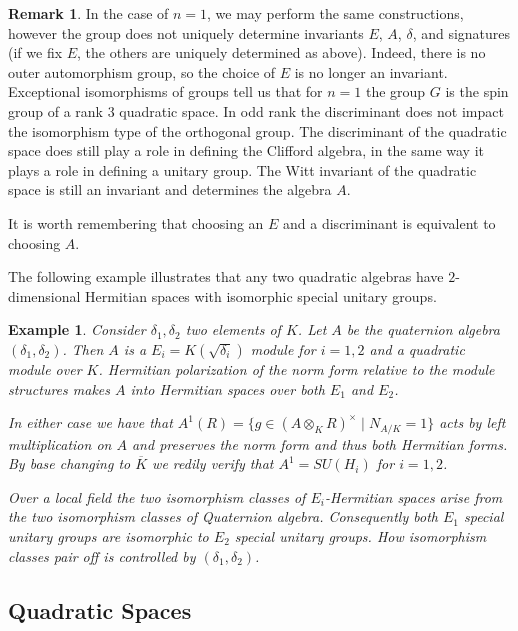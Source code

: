\documentclass{article}
\theoremstyle{plain}
\newtheorem{example}[theorem]{Example}
\theoremstyle{definition}
\newtheorem{remark}[theorem]{Remark}
\begin{document}
\begin{remark}
In the case of $n=1$, we may perform the same constructions, however the group does not uniquely determine invariants $E$, $A$, $\delta$, and signatures (if we fix $E$, the others are uniquely determined as above).
Indeed, there is no outer automorphism group, so the choice of $E$ is no longer an invariant.
Exceptional isomorphisms of groups tell us that for $n=1$ the group $G$ is the spin group of a rank $3$ quadratic space.
In odd rank the discriminant does not impact the isomorphism type of the orthogonal group.
The discriminant of the quadratic space does still play a role in defining the Clifford algebra, in the same way it plays a role in defining a unitary group. The Witt invariant of the quadratic space is still an invariant and determines the algebra $A$.

It is worth remembering that choosing an $E$ and a discriminant is equivalent to choosing $A$.

The following example illustrates that any two quadratic algebras have $2$-dimensional Hermitian spaces with isomorphic special unitary groups.
\begin{example}
Consider $\delta_1,\delta_2$ two elements of $K$.
Let $A$ be the quaternion algebra $(\delta_1,\delta_2)$.
Then $A$ is a $E_i=K(\sqrt{\delta_i})$ module for $i=1,2$ and a quadratic module over $K$.
Hermitian  polarization of the norm form relative to the module structures makes $A$ into Hermitian spaces over both $E_1$ and $E_2$.

In either case we have that $A^1(R) = \{ g\in (A\otimes_K R)^\times \mid N_{A/K} = 1 \}$ acts by left multiplication on $A$ and preserves the norm form and thus both Hermitian forms. By base changing to $\overline{K}$ we redily verify that $A^1 = SU(H_i)$ for $i=1,2$.

Over a local field the two isomorphism classes of $E_i$-Hermitian spaces arise from the two isomorphism classes of Quaternion algebra.
Consequently both $E_1$ special unitary groups are isomorphic to $E_2$ special unitary groups.
How isomorphism classes pair off is controlled by $(\delta_1,\delta_2)$.
\end{example}
\end{remark}




\subsection{Quadratic Spaces}
 
\end{document}

